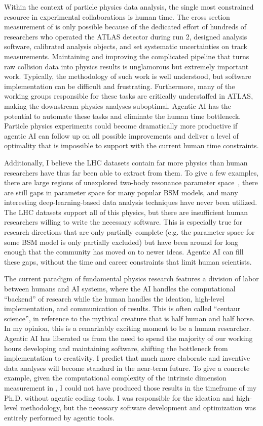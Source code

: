 Within the context of particle physics data analysis, the single most constrained resource in experimental collaborations is human time.
The cross section measurement of  is only possible because of the dedicated effort of hundreds of researchers who operated the ATLAS detector during run 2, designed analysis software, calibrated analysis objects, and set systematic uncertainties on track measurements.
Maintaining and improving the complicated pipeline that turns raw collision data into physics results is unglamorous but extremely important work.
Typically, the methodology of such work is well understood, but software implementation can be difficult and frustrating.
Furthermore, many of the working groups responsible for these tasks are critically understaffed in ATLAS, making the downstream physics analyses suboptimal.
Agentic AI has the potential to automate these tasks and eliminate the human time bottleneck.
Particle physics experiments could become dramatically more productive if agentic AI can follow up on all possible improvements and deliver a level of optimality that is impossible to support with the current human time constraints.

Additionally, I believe the LHC datasets contain far more physics than human researchers have thus far been able to extract from them.
To give a few examples, there are large regions of unexplored two-body resonance parameter space~\cite{Craig:2016rqv,Kim:2019rhy}, there are still gaps in parameter space for many popular BSM models, and many interesting deep-learning-based data analysis techniques have never been utilized.
The LHC datasets support all of this physics, but there are insufficient human researchers willing to write the necessary software.
This is especially true for research directions that are only partially complete (e.g. the parameter space for some BSM model is only partially excluded) but have been around for long enough that the community has moved on to newer ideas.
Agentic AI can fill these gaps, without the time and career constraints that limit human scientists.

The current paradigm of fundamental physics research features a division of labor between humans and AI systems, where the AI handles the computational ``backend'' of research while the human handles the ideation, high-level implementation, and communication of results.
This is often called ``centaur science'', in reference to the mythical creature that is half human and half horse.
In my opinion, this is a remarkably exciting moment to be a human researcher.
Agentic AI has liberated us from the need to spend the majority of our working hours developing and maintaining software, shifting the bottleneck from implementation to creativity.
I predict that much more elaborate and inventive data analyses will become standard in the near-term future.
To give a concrete example, given the computational complexity of the intrinsic dimension measurement in , I could not have produced those results in the timeframe of my Ph.D. without agentic coding tools.
I was responsible for the ideation and high-level methodology, but the necessary software development and optimization was entirely performed by agentic tools.

